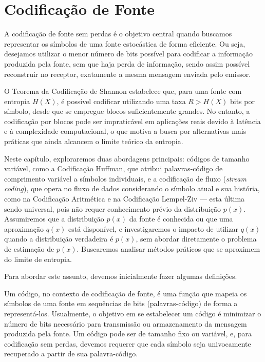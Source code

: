 \chapter{Codificação de Fonte}

A codificação de fonte sem perdas é o objetivo central quando
buscamos representar os símbolos de uma fonte estocástica de forma eficiente.
Ou seja, desejamos utilizar o menor número de bits possível para
codificar a informação produzida pela fonte, sem que haja perda de informação,
sendo assim possível reconstruir no receptor, exatamente a mesma mensagem
enviada pelo emissor.

O Teorema da Codificação de Shannon estabelece que, para uma fonte com entropia
$H(X)$, é possível codificar utilizando uma taxa $R > H(X)$ bits por símbolo,
desde que se empregue blocos suficientemente grandes. No entanto, a codificação
por blocos pode ser impraticável em aplicações reais devido à latência e à
complexidade computacional, o que motiva a busca por alternativas mais práticas
que ainda alcancem o limite teórico da entropia.

Neste capítulo, exploraremos duas abordagens principais: códigos de tamanho
variável, como a Codificação Huffman, que atribui palavras-código de
comprimento variável a símbolos individuais, e a codificação de fluxo
(\textit{stream coding}), que opera no fluxo de dados considerando o símbolo
atual e sua história, como na Codificação Aritmética e na Codificação
Lempel-Ziv --- esta última sendo universal, pois não requer conhecimento prévio
da distribuição $p(x)$. Assumiremos que a distribuição $p(x)$ da fonte é
conhecida ou que uma aproximação $q(x)$ está disponível, e investigaremos o
impacto de utilizar $q(x)$ quando a distribuição verdadeira é $p(x)$, sem
abordar diretamente o problema de estimação de $p(x)$. Buscaremos
analisar métodos práticos que se aproximem do limite de entropia.

Para abordar este assunto, devemos inicialmente fazer algumas definições.

Um código, no contexto de codificação de fonte, é uma função que mapeia os
símbolos de uma fonte em sequências de bits (palavras-código) de forma a
representá-los. Usualmente, o objetivo em se estabelecer um código é minimizar
o número de bits necessário para transmissão ou armazenamento da mensagem
produzida pela fonte. Um código pode ser de tamanho fixo ou variável, e, para
codificação sem perdas, devemos requerer que cada símbolo seja
univocamente recuperado a partir de sua palavra-código.

